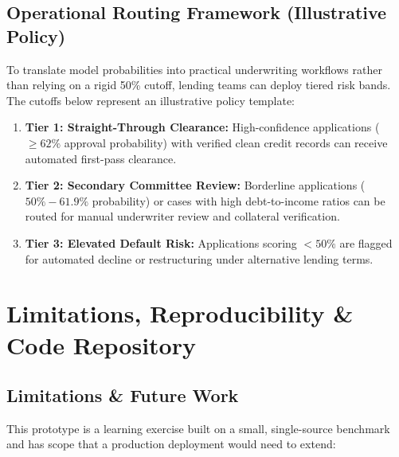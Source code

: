 \documentclass[11pt,a4paper]{article}
\begin{document}
\subsection{Operational Routing Framework (Illustrative Policy)}
To translate model probabilities into practical underwriting workflows rather than relying on a rigid 50\% cutoff, lending teams can deploy tiered risk bands. The cutoffs below represent an illustrative policy template:

\vspace{0.15cm}

\begin{enumerate}
    \item \textbf{Tier 1: Straight-Through Clearance:} High-confidence applications ($\ge 62\%$ approval probability) with verified clean credit records can receive automated first-pass clearance.
    \item \textbf{Tier 2: Secondary Committee Review:} Borderline applications ($50\% - 61.9\%$ probability) or cases with high debt-to-income ratios can be routed for manual underwriter review and collateral verification.
    \item \textbf{Tier 3: Elevated Default Risk:} Applications scoring $< 50\%$ are flagged for automated decline or restructuring under alternative lending terms.
\end{enumerate}

\clearpage


\section{Limitations, Reproducibility \& Code Repository}

\subsection{Limitations \& Future Work}
This prototype is a learning exercise built on a small, single-source benchmark and has scope that a production deployment would need to extend:

\vspace{0.15cm}
\end{document}
